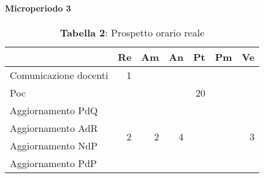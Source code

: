 \paragraph{Microperiodo 3}
\begin{table}[H]
	\centering
	\begin{tabular}{|l|r|r|r|l|l|r|}
		\hline
		\rowcolor{lighter-grayer}
		\multicolumn{1}{|c|}{\textbf{Attività}} & \multicolumn{1}{c|}{\textbf{Re}} & \multicolumn{1}{c|}{\textbf{Am}} & \multicolumn{1}{c|}{\textbf{An}} & \multicolumn{1}{c|}{\textbf{Pt}} & \multicolumn{1}{c|}{\textbf{Pm}} & \multicolumn{1}{c|}{\textbf{Ve}} \\ \hline
		Comunicazione docenti                   & 1                                & \multicolumn{1}{l|}{}            & \multicolumn{1}{l|}{}            &                                  &                                  & \multicolumn{1}{l|}{}            \\ \hline
		Poc                                     & \multicolumn{1}{l|}{}            & \multicolumn{1}{l|}{}            & \multicolumn{1}{l|}{}            & \multicolumn{1}{r|}{20}          &                                  & \multicolumn{1}{l|}{}            \\ \hline
		Aggiornamento PdQ                       & \multirow{4}{*}{2}               & \multirow{4}{*}{2}               & \multirow{4}{*}{4}               &                                  &                                  & \multirow{4}{*}{3}               \\ \cline{1-1} \cline{5-6}
		Aggiornamento AdR                       &                                  &                                  &                                  &                                  &                                  &                                  \\ \cline{1-1} \cline{5-6}
		Aggiornamento NdP                       &                                  &                                  &                                  &                                  &                                  &                                  \\ \cline{1-1} \cline{5-6}
		Aggiornamento PdP                       &                                  &                                  &                                  &                                  &                                  &                                  \\ \hline
	\end{tabular}
\caption*{\textbf{Tabella 2}: Prospetto orario reale\\}
\end{table}

